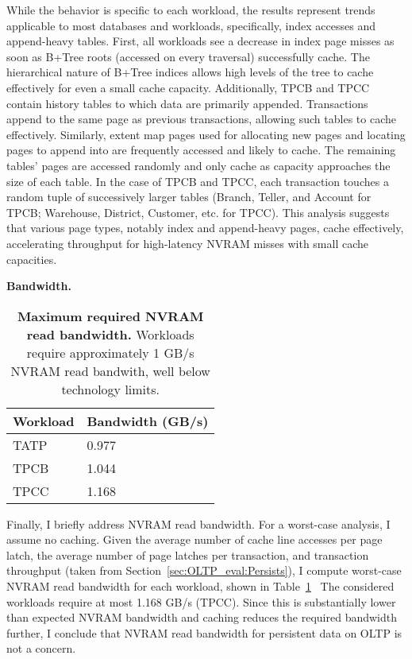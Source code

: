 While the behavior is specific to each workload, the results represent trends applicable to most databases and workloads, specifically, index accesses and append-heavy tables.
First, all workloads see a decrease in index page misses as soon as B+Tree roots (accessed on every traversal) successfully cache.
The hierarchical nature of B+Tree indices allows high levels of the tree to cache effectively for even a small cache capacity.
Additionally, TPCB and TPCC contain history tables to which data are primarily appended.
Transactions append to the same page as previous transactions, allowing such tables to cache effectively.
Similarly, extent map pages used for allocating new pages and locating pages to append into are frequently accessed and likely to cache.
The remaining tables' pages are accessed randomly and only cache as capacity approaches the size of each table.
In the case of TPCB and TPCC, each transaction touches a random tuple of successively larger tables (Branch, Teller, and Account for TPCB; Warehouse, District, Customer, etc. for TPCC).
This analysis suggests that various page types, notably index and append-heavy pages, cache effectively, accelerating throughput for high-latency NVRAM misses with small cache capacities.

\textbf{Bandwidth.}
\begin{table}
  \centering
  \begin{tabular}{l l}
    \hline
    Workload & Bandwidth (GB/s) \\
    \hline \hline
    TATP & 0.977 \\
    TPCB & 1.044 \\
    TPCC & 1.168 \\
    \hline
  \end{tabular}
  \caption{\textbf{Maximum required NVRAM read bandwidth.} Workloads require approximately 1 GB/s NVRAM read bandwith, well below technology limits.}
  \label{table::ReadBandwidth}
\end{table}

Finally, I briefly address NVRAM read bandwidth.
For a worst-case analysis, I assume no caching.
Given the average number of cache line accesses per page latch, the average number of page latches per transaction, and transaction throughput (taken from Section~\ref{sec:OLTP_eval:Persists}), I compute worst-case NVRAM read bandwidth for each workload, shown in Table~\ref{table::ReadBandwidth}~
The considered workloads require at most 1.168 GB/s (TPCC).
Since this is substantially lower than expected NVRAM bandwidth and caching reduces the required bandwidth further, I conclude that NVRAM read bandwidth for persistent data on OLTP is not a concern.

